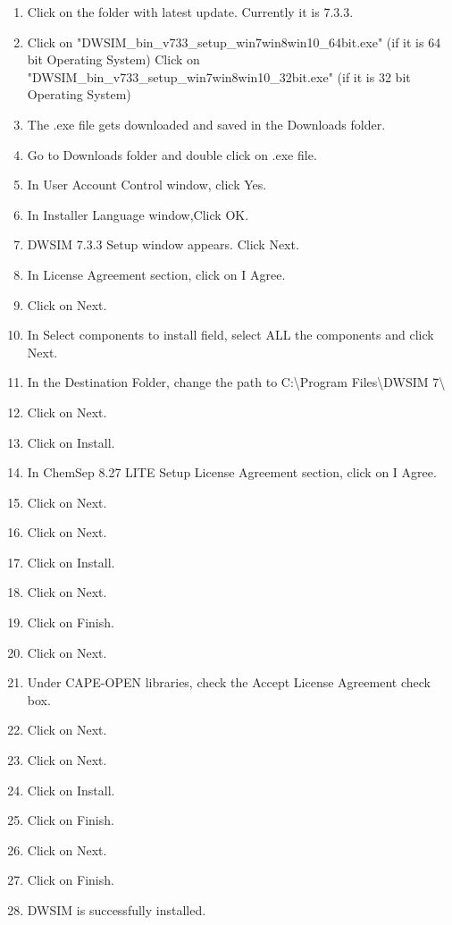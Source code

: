 \documentclass[12pt,a4paper]{article}
\begin{document}
\begin{enumerate}
\item Click on the folder with latest update. Currently it is 7.3.3.
\item Click on "DWSIM\_bin\_v733\_setup\_win7win8win10\_64bit.exe" (if it is 64 bit Operating System)
\newline Click on "DWSIM\_bin\_v733\_setup\_win7win8win10\_32bit.exe" (if it is 32 bit Operating System)
\item The .exe file gets downloaded and saved in the Downloads folder.
\item Go to Downloads folder and double click on .exe file.
\item In User Account Control window, click Yes.
\item In Installer Language window,Click OK.
\item DWSIM 7.3.3 Setup window appears. Click Next.
\item In License Agreement section, click on I Agree.
\item Click on Next.
\item In Select components to install field, select ALL the components and click Next.
\item In the Destination Folder, change the path to C:\textbackslash Program Files\textbackslash DWSIM 7\textbackslash
\item Click on Next.
\item Click on Install.
\item In ChemSep 8.27 LITE Setup License Agreement section, click on I Agree.
\item Click on Next.
\item Click on Next.
\item Click on Install.
\item Click on Next.
\newpage
\item Click on Finish.
\item Click on Next.
\item Under CAPE-OPEN libraries, check the Accept License Agreement check box.
\item Click on Next.
\item Click on Next.
\item Click on Install.
\item Click on Finish.
\item Click on Next.
\item Click on Finish.
\item DWSIM is successfully installed.

\end{enumerate}
\end{document}
